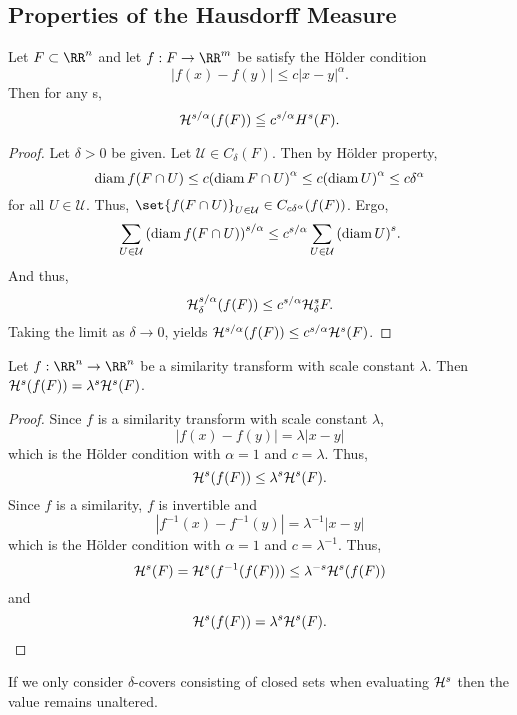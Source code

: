 \subsection{Properties of the Hausdorff Measure}

\begin{thm}\label{hm-holder}
	Let $F\subset\RR^n$ and let $f: F\rightarrow\RR^m$ be satisfy the H\"older condition
	\[
		|f(x)-f(y)| \leq c|x-y|^\alpha.
	\]
	Then for any s,
	\[
		\mathcal{H}^{s/\alpha}(f(F))\leqq c^{s/\alpha}H^s(F).
	\]
\end{thm}
\begin{proof}
	Let $\delta>0$ be given.
	Let $\mathcal{U}\in C_\delta(F)$.
	Then by H\"older property,
	\[
		\operatorname{diam} f(F\cap U)\leq c{(\operatorname{diam} F\cap U)}^\alpha \leq c{(\operatorname{diam} U)}^\alpha\leq c\delta^\alpha
	\]
	for all $U\in\mathcal{U}$.
	Thus, $\set{f(F\cap U)}_{U\in\mathcal U}\in C_{c\delta^\alpha}(f(F))$.
	Ergo,
	\[
		\sum_{U\in\mathcal{U}} {(\operatorname{diam} f(F\cap U))}^{s/\alpha}\leq c^{s/\alpha}\sum_{U\in\mathcal{U}}{(\operatorname{diam} U)}^s.
	\]
	And thus,
	\[
		\mathcal{H}^{s/\alpha}_\delta (f(F)) \leq c^{s/\alpha}\mathcal{H}^s_\delta F.
	\]
	Taking the limit as $\delta\rightarrow 0$, yields $\mathcal{H}^{s/\alpha}(f(F))\leq c^{s/\alpha}\mathcal{H}^s(F)$.
\end{proof}

\begin{thm}\label{hm-sim}
	Let $f:\RR^n\rightarrow\RR^n$ be a similarity transform with scale constant $\lambda$.
	Then $\mathcal{H}^s(f(F))=\lambda^s\mathcal{H}^s(F)$.
\end{thm}
\begin{proof}
	Since $f$ is a similarity transform with scale constant $\lambda$,
	\[
		|f(x)-f(y)|=\lambda|x-y|
	\]
	which is the H\"older condition with $\alpha=1$ and $c=\lambda$.
	Thus,
	\[
		\mathcal{H}^s(f(F))\leq \lambda^s\mathcal{H}^s(F).
	\]
	Since $f$ is a similarity, $f$ is invertible and
	\[
		|f^{-1}(x)-f^{-1}(y)|=\lambda^{-1}|x-y|
	\]
	which is the H\"older condition with $\alpha=1$ and $c=\lambda^{-1}$.
	Thus,
	\[
		\mathcal{H}^s(F)=\mathcal{H}^s(f^{-1}(f(F)))\leq\lambda^{-s}\mathcal{H}^s(f(F))
	\]
	and
	\[
		\mathcal{H}^s(f(F))=\lambda^s\mathcal{H}^s(F).
	\]
\end{proof}

\begin{proposition}
	If we only consider $\delta$-covers consisting of closed sets when evaluating $\mathcal{H}^s$ then the value remains unaltered.
\end{proposition}

